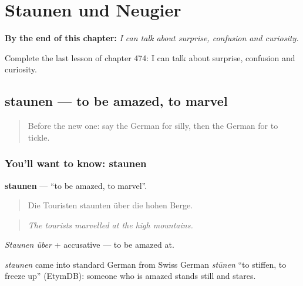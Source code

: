 
\chapter{Staunen und Neugier}
\label{ch:ge-staunen-und-neugier}

\begin{chapteropening}
\textbf{By the end of this chapter:} \emph{I can talk about surprise, confusion and curiosity.}

Complete the last lesson of chapter 474: I can talk about surprise, confusion and curiosity.
\end{chapteropening}

\section[staunen]{staunen — to be amazed, to marvel}

\label{lesson:GE-C474-staunen}



\begin{quote}
Before the new one: say the German for silly, then the German for to tickle.
\end{quote}

\subsection*{You'll want to know: staunen}
\textbf{staunen} — \textquotedblleft{}to be amazed, to marvel\textquotedblright{}.

\begin{quote}
Die Touristen staunten über die hohen Berge.
\end{quote}

\begin{quote}
\emph{The tourists marvelled at the high mountains.}
\end{quote}

\emph{Staunen über} + accusative — to be amazed at.

\begin{cousinweb}
\emph{staunen} came into standard German from Swiss German \emph{stūnen} \textquotedblleft{}to stiffen, to freeze up\textquotedblright{} (EtymDB): someone who is amazed stands still and stares.
\end{cousinweb}

